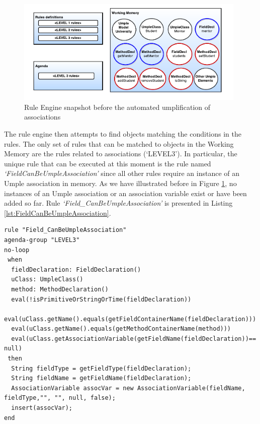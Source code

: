 \begin{figure}[h]
\centering
\includegraphics[width=0.98\textwidth]{Figures/ruleModelAssoc1.pdf}
\caption{Rule Engine snapshot before the automated umplification of associations}
\label{fig:ruleModelAssoc1}
\end{figure}

The rule engine then attempts to find objects matching the conditions in the rules. The only set of rules that can be matched to objects in the Working Memory are the rules related to associations (`LEVEL3'). In particular, the unique rule that can be executed at this moment is the rule named \textit{`FieldCanBeUmpleAssociation'} since all other rules require an instance of an Umple association in memory. As we have illustrated before in Figure \ref{fig:ruleModelAssoc1}, no instances of an Umple association or an association variable exist or have been added so far. Rule \textit{`Field\_CanBeUmpleAssociation'} is presented in Listing \ref{lst:FieldCanBeUmpleAssociation}. 

\begin{lstlisting}[language={drools},label=lst:FieldCanBeUmpleAssociation, caption=Rule FieldCanBeUmpleAssociation]
rule "Field_CanBeUmpleAssociation"
agenda-group "LEVEL3" 
no-loop
 when
  fieldDeclaration: FieldDeclaration()
  uClass: UmpleClass()
  method: MethodDeclaration()
  eval(!isPrimitiveOrStringOrTime(fieldDeclaration))				   
  eval(uClass.getName().equals(getFieldContainerName(fieldDeclaration)))
  eval(uClass.getName().equals(getMethodContainerName(method)))
  eval(uClass.getAssociationVariable(getFieldName(fieldDeclaration))== null)
 then
  String fieldType = getFieldType(fieldDeclaration);
  String fieldName = getFieldName(fieldDeclaration);
  AssociationVariable assocVar = new AssociationVariable(fieldName, fieldType,"", "", null, false);
  insert(assocVar); 	
end
\end{lstlisting}

